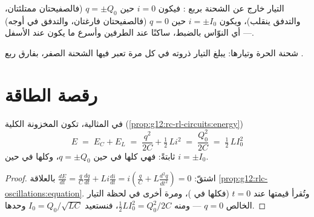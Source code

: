 \begin{remark}\label{rem:g12:rlc-oscillations:quarter}
التيار خارج  عن الشحنة بربع : فيكون $i = 0$
حين $q = \pm Q_0$ (فالصفيحتان ممتلئتان، والتدفق ينقلب)، ويكون $i = \pm I_0$
حين $q = 0$ (فالصفيحتان فارغتان، والتدفق في أوجه) --- أي النوّاس
بالضبط، ساكنًا عند الطرفين وأسرع ما يكون عند الأسفل.
\end{remark}

\begin{omfigure}

{\small شحنة  الحرة وتيارها: يبلغ التيار ذروته
في كل مرة تعبر فيها الشحنة الصفر، بفارق ربع .}
\end{omfigure}

\section{رقصة الطاقة}

\begin{proposition}\label{prop:g12:rlc-oscillations:energy}
في  المثالية، تكون  المخزونة الكلية
(\cref{prop:g12:rc-rl-circuits:energy})
\[
E \;=\; E_C + E_L \;=\; \frac{q^2}{2C} + \tfrac12\,L i^2
\;=\; \frac{Q_0^2}{2C} \;=\; \tfrac12\,L I_0^2
\]
ثابتةً: فهي كلها في  حين $q = \pm Q_0$، وكلها في
 حين $i = \pm I_0$.
\end{proposition}

\begin{proof}
اشتقّ: $\frac{dE}{dt} = \frac{q}{C}\frac{dq}{dt} +
Li\frac{di}{dt} = i\left(\frac{q}{C} + L\frac{d^2q}{dt^2}\right) = 0$
بالعلاقة \cref{prop:g12:rlc-oscillations:equation}. وتُقرأ قيمتها عند
$t = 0$ (فكلها في )، ومرة أخرى في لحظة التيار الخالص
$q = 0$ --- ومنه $\tfrac12 L I_0^2 = Q_0^2/2C$، فنستعيد
$I_0 = Q_0/\sqrt{LC}$  وحدها.
\end{proof}

